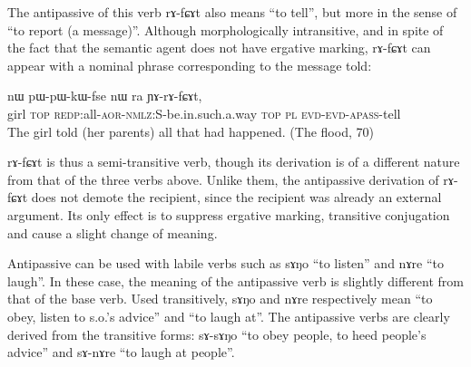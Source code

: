 \documentclass[oldfontcommands,oneside,a4paper,11pt]{memoir}
\newcommand{\ipa}[1]{{\phon #1}} %
\newcommand{\apass}{\textsc{apass}}
\newcommand{\appl}{\textsc{appl}}
\newcommand{\aor}{\textsc{aor}}
\newcommand{\evd}{\textsc{evd}}
\newcommand{\neu}{\textsc{neu}}
\newcommand{\nmlz}{\textsc{nmlz}}
\newcommand{\npst}{\textsc{n.pst}}
\newcommand{\pl}{\textsc{pl}}
\newcommand{\qu}{\textsc{qu}}
\newcommand{\redp}{\textsc{redp}}
\newcommand{\topic}{\textsc{top}}
\begin{document}
The antipassive of this verb \ipa{rɤ-fɕɤt} also means ``to tell'', but more in the sense of ``to report (a message)''. Although morphologically intransitive, and in spite of the fact that the semantic agent does not have ergative marking, \ipa{rɤ-fɕɤt} can appear with a nominal phrase corresponding to the message told:
  \begin{exe}
\ex
\gll  \ipa{tɕheme} 	\ipa{nɯ} 	\ipa{pɯ-pɯ-kɯ-fse} 		\ipa{nɯ} \ipa{ra} 	\ipa{ɲɤ-rɤ-fɕɤt,}    \\
     girl \topic{} \redp{}:all-\aor{}-\nmlz{}:S-be.in.such.a.way \topic{} \pl{} \evd{}-\evd{}-\apass{}-tell   \\
 \glt  The girl told (her parents) all that had happened.  (The flood, 70)
\end{exe} 
\ipa{rɤ-fɕɤt} is thus a semi-transitive verb, though its derivation is of a different nature from that of the three verbs above. Unlike them, the antipassive derivation of \ipa{rɤ-fɕɤt} does not demote the recipient, since the recipient was already an external argument. Its only effect  is to suppress ergative marking, transitive conjugation and cause a slight change of meaning.



%
 




Antipassive can be used with labile verbs such as \ipa{sɤŋo} ``to listen'' and \ipa{nɤre} ``to laugh''. In these case, the meaning of the antipassive verb is slightly different from that of the base verb. Used transitively, \ipa{sɤŋo} and \ipa{nɤre} respectively mean ``to obey, listen to s.o.'s advice'' and ``to laugh at''. The antipassive verbs are clearly derived from the transitive forms: \ipa{sɤ-sɤŋo} ``to obey people, to heed people's advice'' and \ipa{sɤ-nɤre} ``to laugh at people''.
 
\end{document}
